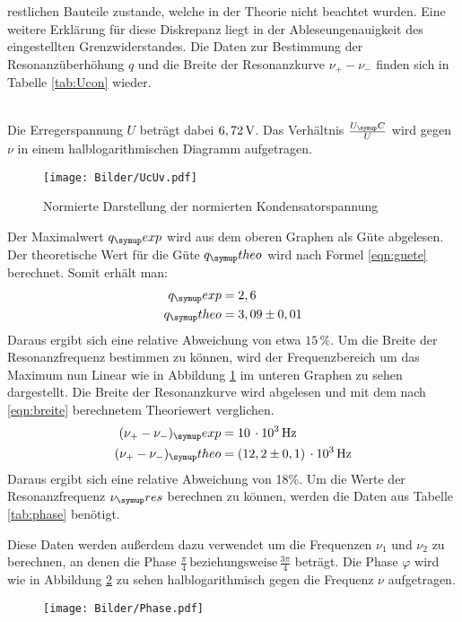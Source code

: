 restlichen Bauteile zustande, welche in der Theorie nicht beachtet wurden.
Eine weitere Erklärung für diese Diskrepanz liegt in der Ableseungenauigkeit
des eingestellten Grenzwiderstandes.
Die Daten zur Bestimmung der Resonanzüberhöhung $q$ und die Breite der
Resonanzkurve $\nu_+ - \nu_-$ finden sich in Tabelle \ref{tab:Ucon} wieder.

\\
Die Erregerspannung $U$ beträgt dabei $6,72 \,\si{\volt}$.
Das Verhältnis $\frac{U_\su{C}}{U}$ wird gegen $\nu$ in einem halblogarithmischen
Diagramm aufgetragen.
\begin{figure}[h]
  \centering
  \texttt{[image: Bilder/UcUv.pdf]}
  \caption{Normierte Darstellung der normierten Kondensatorspannung}
  \label{fig:UcUv}
\end{figure}
Der Maximalwert $q_\su{exp}$ wird aus dem oberen Graphen als Güte abgelesen. Der
theoretische Wert für die Güte $q_\su{theo}$ wird nach Formel \eqref{eqn:guete} berechnet.
Somit erhält man:
\begin{align*}
  q_\su{exp} &= 2,6 \\
  q_\su{theo} &= 3,09 \pm 0,01
\end{align*}
Daraus ergibt sich eine relative Abweichung von etwa $15\,\si{\percent}$. Um
die Breite der Resonanzfrequenz bestimmen zu können, wird der Frequenzbereich
um das Maximum nun Linear wie in Abbildung \ref{fig:UcUv} im unteren Graphen
zu sehen dargestellt. Die Breite der Resonanzkurve wird abgelesen und mit dem
nach \eqref{eqn:breite} berechnetem Theoriewert verglichen.
\begin{align*}
  (\nu_+ - \nu_-)_\su{exp} &= 10\,\cdot10^3\Hz \\
  (\nu_+ - \nu_-)_\su{theo}&= (12,2 \pm 0,1)\,\cdot 10^3\Hz %
\end{align*}
Daraus ergibt sich eine relative Abweichung von 18\si{\percent}.
Um die Werte der Resonanzfrequenz $\nu_\su{res}$ berechnen zu können, werden
die Daten aus Tabelle \ref{tab:phase} benötigt.

Diese Daten werden außerdem dazu verwendet um die Frequenzen $\nu_1$ und
$\nu_2$ zu berechnen, an denen die Phase $\frac{\pi}{4}\,\text{beziehungsweise}\,
\frac{3\pi}{4}$ beträgt. Die Phase $\varphi$ wird wie in Abbildung \ref{fig:phse}
zu sehen halblogarithmisch gegen die Frequenz $\nu$ aufgetragen.
\begin{figure}[h]
  \centering
  \texttt{[image: Bilder/Phase.pdf]}
  \caption{}
  \label{fig:phse}
\end{figure}
